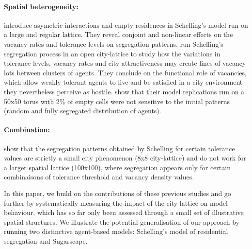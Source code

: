 \documentclass[Royal,sageh,times]{sagej}
\begin{document}
\paragraph{Spatial heterogeneity:} \citet{StaufferSolomon2007} introduce asymetric interactions and empty residences in Schelling's model run on a large and regular lattice. They reveal conjoint and non-linear effects on the vacancy rates and tolerance levels on segregation patterns. \citet{Gauvinetal2010} run Schelling's segregation process in an open city-lattice to study how the variations in tolerance levels, vacancy rates and city attractiveness may create lines of vacancy lots between clusters of agents. They conclude on the functional role of vacancies, which allow weakly tolerant agents to live and be satisfied in a city environment they nevertheless perceive as hostile. \citet{HatnaBenenson2012} show that their model replications run on a 50x50 torus with 2\% of empty cells were not sensitive to the initial patterns (random and fully segregated distribution of agents).

\paragraph{Combination:} \citet{Singhetal2009} show that the segregation patterns obtained by Schelling for certain tolerance values are strictly a small city phenomenon (8x8 city-lattice) and do not work for a larger spatial lattice (100x100), where segregation appears only for certain combinaisons of tolerance threshold and vacancy density values. 





In this paper, we build on the contributions of these previous studies and go further by systematically measuring the impact of the city lattice on model behaviour, which has so far only been assessed through a small set of illustrative spatial structures. We illustrate the potential generalisation of our approach by running two distinctive agent-based models: Schelling's model of residential segregation and Sugarscape.
\end{document}
